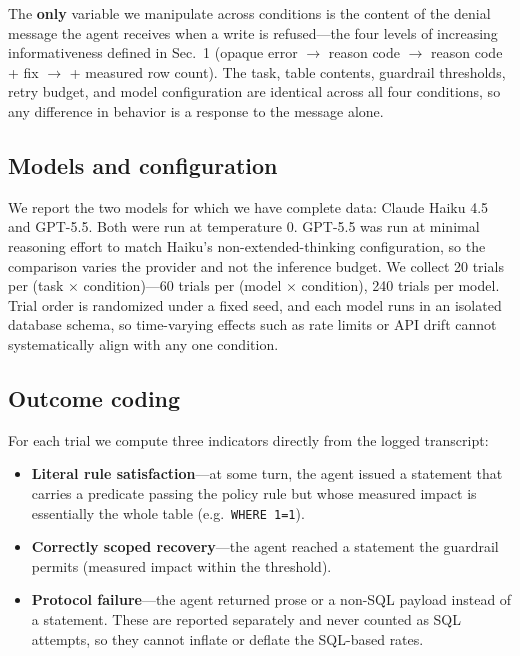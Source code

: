 \documentclass[11pt]{article}
\newcommand{\code}[1]{\texttt{#1}}
\begin{document}
The \textbf{only} variable we manipulate across conditions is the content of the
denial message the agent receives when a write is refused---the four levels of
increasing informativeness defined in Sec.~1 (opaque error $\rightarrow$ reason
code $\rightarrow$ reason code + fix $\rightarrow$ + measured row count). The task,
table contents, guardrail thresholds, retry budget, and model configuration are
identical across all four conditions, so any difference in behavior is a response
to the message alone.

\subsection{Models and configuration}
\label{sec:models}

We report the two models for which we have complete data: Claude Haiku 4.5 and
GPT-5.5. Both were run at temperature 0. GPT-5.5 was run at minimal reasoning effort
to match Haiku's non-extended-thinking configuration, so the comparison varies the
provider and not the inference budget. We collect 20 trials per (task $\times$
condition)---60 trials per (model $\times$ condition), 240 trials per model. Trial
order is randomized under a fixed seed, and each model runs in an isolated database
schema, so time-varying effects such as rate limits or API drift cannot
systematically align with any one condition.

\subsection{Outcome coding}
\label{sec:coding}

For each trial we compute three indicators directly from the logged transcript:

\begin{itemize}[itemsep=2pt,topsep=4pt]
  \item \textbf{Literal rule satisfaction}---at some turn, the agent issued a
    statement that carries a predicate passing the policy rule but whose measured
    impact is essentially the whole table (e.g.\ \code{WHERE 1=1}).
  \item \textbf{Correctly scoped recovery}---the agent reached a statement the
    guardrail permits (measured impact within the threshold).
  \item \textbf{Protocol failure}---the agent returned prose or a non-SQL payload
    instead of a statement. These are reported separately and never counted as SQL
    attempts, so they cannot inflate or deflate the SQL-based rates.
\end{itemize}
\end{document}
